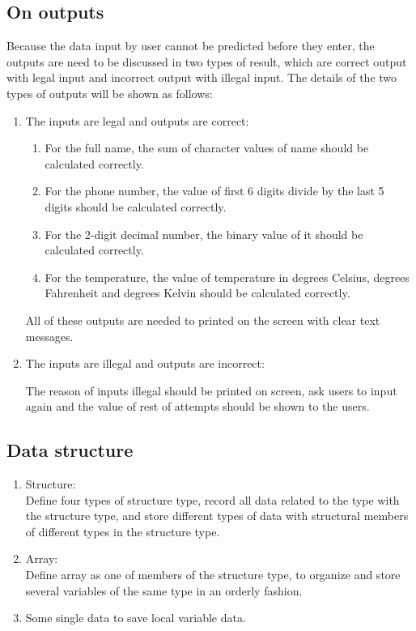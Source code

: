 \documentclass[12pt]{article}
\begin{document}
	\subsection{On outputs}
	Because the data input by user cannot be predicted before they enter, the outputs are need to be discussed in two types of result, which are correct output with legal input and incorrect output with illegal input. The details of the two types of outputs will be shown as follows:
	
	\begin{enumerate}
		\item The inputs are legal and outputs are correct:
	
		\begin{enumerate}
			\item For the full name, the sum of character values of name should be calculated correctly.
			\item For the phone number, the value of first 6 digits divide by the last 5 digits should be calculated correctly.
			\item For the 2-digit decimal number, the binary value of it should be calculated correctly.
			\item For the temperature, the value of temperature in degrees Celsius, degrees Fahrenheit and degrees Kelvin should be calculated correctly.
		\end{enumerate}
		
		All of these outputs are needed to printed on the screen with clear text messages.
	
		\item The inputs are illegal and outputs are incorrect:
		
		The reason of inputs illegal should be printed on screen, ask users to input again and the value of rest of attempts should be shown to the users.
	\end{enumerate}

	\subsection{Data structure}
	
	\begin{enumerate}
		\item Structure:\\
		Define four types of structure type, record all data related to the type with the structure type, and store different types of data with structural members of different types in the structure type.
		
		\item Array:\\
		Define array as one of members of the structure type, to organize and store several variables of the same type in an orderly fashion.
		
		\item Some single data to save local variable data.
	\end{enumerate}
\end{document}
